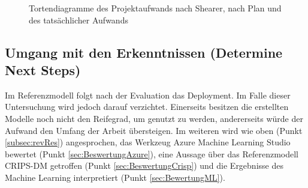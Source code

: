 \begin{figure}[H]
\centering
{}
\caption{Tortendiagramme des Projektaufwands nach Shearer, nach Plan und des tatsächlicher Aufwands}
\label{fig:phases}
\end{figure}

\subsection{Umgang mit den Erkenntnissen (Determine Next Steps)}
Im Referenzmodell folgt nach der Evaluation das Deployment. Im Falle dieser Untersuchung wird jedoch darauf verzichtet. Einerseits besitzen die erstellten Modelle noch nicht den Reifegrad, um genutzt zu werden, andererseits würde der Aufwand den Umfang der Arbeit übersteigen.
Im weiteren wird wie oben (Punkt \ref{subsec:revRes}) angesprochen, das Werkzeug Azure Machine Learning Studio bewertet (Punkt \ref{sec:BeswertungAzure}), eine Aussage über das Referenzmodell CRIPS-DM getroffen (Punkt \ref{sec:BeswertungCrisp}) und die Ergebnisse des Machine Learning interpretiert (Punkt \ref{sec:BewertungML}).




